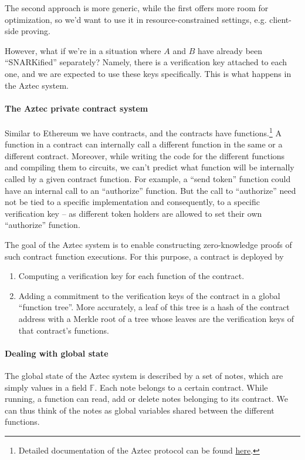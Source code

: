 \documentclass[11pt]{article} %
\newcommand{\Patrick}[1]{\textcolor{blue}{{\bf Patrick}: #1}}
\newcommand{\F}{\ensuremath{\mathbb F}\xspace}
\begin{document}
The second approach is more generic, while the first offers more room for optimization, so we'd want to use it in resource-constrained settings, e.g. client-side proving.


However, what if we're in a situation where $A$ and $B$ have already been ``SNARKified'' separately?
Namely, there is a verification key attached to each one, and we are expected to use these keys specifically.
This is what happens in the Aztec system.
\paragraph{The Aztec private contract system}
Similar to Ethereum we have contracts, and the contracts have functions.\footnote{Detailed documentation of the Aztec protocol can be found \href{https://docs.aztec.network/}{here}.}
A function in a contract can internally call a different function in the same or a different contract. Moreover, while writing the code for the different functions and compiling them to circuits,
we can't predict what function will be internally called by a given contract function. For example, a ``send token'' function could have an internal call to an ``authorize'' function.
But the call to ``authorize'' need not be tied to a specific implementation and consequently, to a specific verification key -- as different token holders are 
allowed to set their own ``authorize'' function.


The goal of the Aztec system is to enable constructing zero-knowledge proofs of such contract function executions.
For this purpose, a contract is deployed by
\begin{enumerate}
\item Computing a verification key for each function of the contract.
\item Adding a commitment to the verification keys of the contract in a global ``function tree''. More accurately, a leaf of this tree is a hash of the
contract address with a Merkle root of a tree whose leaves are the verification keys of that contract's functions.
\end{enumerate}

\paragraph{Dealing with global state}
The global state of the Aztec system is described by a set of notes, which are simply values in a field \F.
Each note belongs to a certain contract. While running, a function can read, add or delete notes belonging to its contract.
We can thus think of the notes as global variables shared between the different functions.
\end{document}
